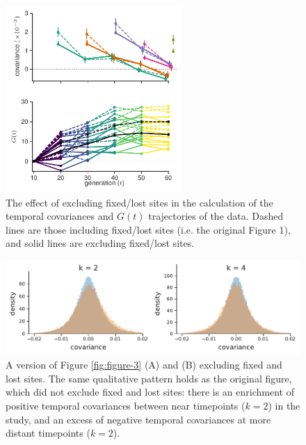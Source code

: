 \documentclass[11pt]{article}
\begin{document}
{{\begin{figure}[!ht]
  \centering
  \includegraphics[width=0.6\textwidth]{figures/figure-1-G-covs-nofix.pdf}

  \caption{The effect of excluding fixed/lost sites in the calculation of the
  temporal covariances and $G(t)$ trajectories of the \textcite{Barghi2019-qy}
data. Dashed lines are those including fixed/lost sites (i.e. the original
Figure 1), and solid lines are excluding fixed/lost sites.}

  \label{suppfig:supp-fig-1-nofix}
\end{figure}

\begin{figure}[!ht]
  \centering
  \includegraphics{figures/figure-3-hists-b-without-fixations.pdf}

  \caption{A version of Figure \ref{fig:figure-3} (A) and (B) excluding fixed
    and lost sites. The same qualitative pattern holds as the original figure,
    which did not exclude fixed and lost sites: there is an enrichment of
    positive temporal covariances between near timepoints ($k=2$) in the
  \textcite{Barghi2019-qy} study, and an excess of negative temporal
covariances at more distant timepoints ($k=2$). }

  \label{suppfig:supp-fig-3-nofix}
\end{figure}



}}
\end{document}
